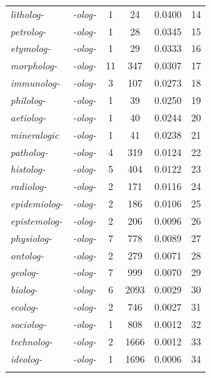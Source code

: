 \begin{table}
\begin{tabular}[t]{lc *{2}{S[table-format=4]} S[round-mode=places,round-precision=4,table-format=1.4] S[table-format=2]}
\textit{litholog-} & \textit{-olog-} & 1 & 24 & 0.0400 & 14 \\
\textit{petrolog-} & \textit{-olog-} & 1 & 28 & 0.0345 & 15 \\
\textit{etymolog-} & \textit{-olog-} & 1 & 29 & 0.0333 & 16 \\
\textit{morpholog-} & \textit{-olog-} & 11 & 347 & 0.0307 & 17 \\
\textit{immunolog-} & \textit{-olog-} & 3 & 107 & 0.0273 & 18 \\
\textit{philolog-} & \textit{-olog-} & 1 & 39 & 0.0250 & 19 \\
\textit{aetiolog-} & \textit{-olog-} & 1 & 40 & 0.0244 & 20 \\
\textit{mineralogic} & \textit{-olog-} & 1 & 41 & 0.0238 & 21 \\
\textit{patholog-} & \textit{-olog-} & 4 & 319 & 0.0124 & 22 \\
\textit{histolog-} & \textit{-olog-} & 5 & 404 & 0.0122 & 23 \\
\textit{radiolog-} & \textit{-olog-} & 2 & 171 & 0.0116 & 24 \\
\textit{epidemiolog-} & \textit{-olog-} & 2 & 186 & 0.0106 & 25 \\
\textit{epistemolog-} & \textit{-olog-} & 2 & 206 & 0.0096 & 26 \\
\textit{physiolog-} & \textit{-olog-} & 7 & 778 & 0.0089 & 27 \\
\textit{ontolog-} & \textit{-olog-} & 2 & 279 & 0.0071 & 28 \\
\textit{geolog-} & \textit{-olog-} & 7 & 999 & 0.0070 & 29 \\
\textit{biolog-} & \textit{-olog-} & 6 & 2093 & 0.0029 & 30 \\
\textit{ecolog-} & \textit{-olog-} & 2 & 746 & 0.0027 & 31 \\
\textit{sociolog-} & \textit{-olog-} & 1 & 808 & 0.0012 & 32 \\
\textit{technolog-} & \textit{-olog-} & 2 & 1666 & 0.0012 & 33 \\
\textit{ideolog-} & \textit{-olog-} & 1 & 1696 & 0.0006 & 34 \\
\lspbottomrule
{} \\ %
\end{tabular}%
\end{table}

